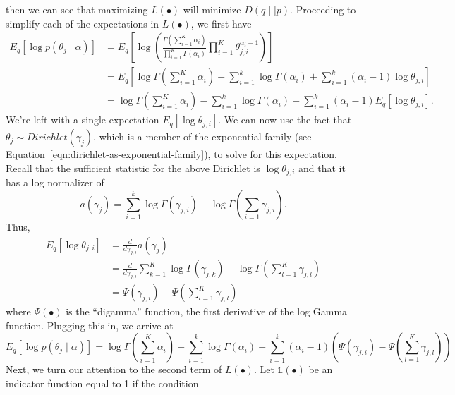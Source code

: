 \documentclass[11pt]{article}
\begin{document}
then we can see that maximizing $L(\bullet)$ will minimize $D(q\mid\mid
p)$. Proceeding to simplify each of the expectations in $L(\bullet)$, we
first have
\begin{align}
  E_q\left[\log p(\theta_j \mid \alpha)\right]
  &=
  E_q\left[
    \log \left(
      \frac{\Gamma(\sum_{i=1}^K \alpha_i)}
      {\prod_{i=1}^K \Gamma(\alpha_i)}
      \prod_{i=1}^K \theta_{j,i}^{\alpha_i - 1}
    \right)
  \right]
  \\&=
  E_q\left[
    \log \Gamma\left(\sum_{i=1}^K \alpha_i\right)
    - \sum_{i=1}^k \log \Gamma(\alpha_i)
    + \sum_{i=1}^k (\alpha_i - 1)\log \theta_{j,i}
  \right]
  \\&=
  \log \Gamma\left(\sum_{i=1}^K \alpha_i\right)
  - \sum_{i=1}^k \log \Gamma(\alpha_i)
  + \sum_{i=1}^k (\alpha_i - 1)E_q\left[\log \theta_{j,i}\right].
\end{align}
We're left with a single expectation $E_q[\log \theta_{j,i}]$. We can now
use the fact that $\theta_j \sim Dirichlet(\gamma_j)$, which is a member of
the exponential family (see
Equation~\ref{eqn:dirichlet-as-exponential-family}), to solve for this
expectation. Recall that the sufficient statistic for the above Dirichlet
is $\log \theta_{j,i}$ and that it has a log normalizer of
\begin{equation}
  a(\gamma_j) = \sum_{i=1}^k \log
  \Gamma(\gamma_{j,i}) - \log \Gamma\left(\sum_{i=1} \gamma_{j,i}\right).
\end{equation}
Thus,
\begin{align}
  \label{eqn:digamma-beg}
  E_q\left[\log \theta_{j,i}\right]
  &=
  \frac{d}{d\gamma_{j,i}} a(\gamma_j)
  \\&=
  \frac{d}{d\gamma_{j,i}} \sum_{k=1}^K \log \Gamma(\gamma_{j,k})
  - \log \Gamma\left(\sum_{l=1}^K \gamma_{j,l}\right)
  \\&=
  \Psi(\gamma_{j,i}) - \Psi\left(\sum_{l=1}^K \gamma_{j,l}\right)
  \label{eqn:digamma-end}
\end{align}
where $\Psi(\bullet)$ is the ``digamma'' function, the first derivative of
the log Gamma function. Plugging this in, we arrive at
\begin{equation}
  E_q\left[\log p(\theta_j \mid \alpha)\right]
  =
  \log \Gamma\left(\sum_{i=1}^K \alpha_i\right)
  - \sum_{i=1}^k \log \Gamma(\alpha_i)
  + \sum_{i=1}^k (\alpha_i - 1)
  \left(\Psi(\gamma_{j,i}) - \Psi\left(\sum_{l=1}^K \gamma_{j,l}\right)\right)
\end{equation}
Next, we turn our attention to the second term of $L(\bullet)$. Let
$\mathbb{1}(\bullet)$ be an indicator function equal to 1 if the condition
\end{document}
